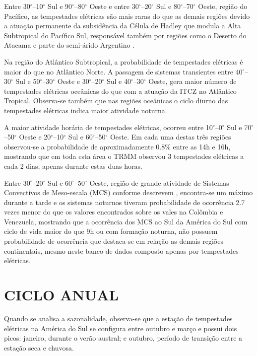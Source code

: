 Entre 30$^{\circ}$--10$^{\circ}$ Sul e 90$^{\circ}$--80$^{\circ}$ Oeste e entre 30$^{\circ}$--20$^{\circ}$ Sul e 80$^{\circ}$--70$^{\circ}$ Oeste, região do Pacífico, as tempestades elétricas são mais raras do que as demais regiões devido a atuação permanente da subsidência da Célula de Hadley que modula a Alta Subtropical do Pacífico Sul, responsável também por regiões como o Deserto do Atacama e parte do semi-árido Argentino \cite{reboita2010regimes}.

Na região do Atlântico Subtropical, a probabilidade de tempestades elétricas é maior do que no Atlântico Norte. A passagem de sistemas transientes entre 40$^{\circ}$--30$^{\circ}$ Sul e 50$^{\circ}$--30$^{\circ}$ Oeste e 30$^{\circ}$--20$^{\circ}$ Sul e 40$^{\circ}$--30$^{\circ}$ Oeste, gera maior número de tempestades elétricas oceânicas do que com a atuação da ITCZ no Atlântico Tropical. Observa-se também que nas regiões oceânicas o ciclo diurno das tempestades elétricas indica maior atividade noturna.


A maior atividade horária de tempestades elétricas, ocorreu entre 10$^{\circ}$--0$^{\circ}$ Sul e 70$^{\circ}$--50$^{\circ}$ Oeste e 20$^{\circ}$--10$^{\circ}$ Sul e 60$^{\circ}$--50$^{\circ}$ Oeste. Em cada uma destas três regiões observou-se a probabilidade de aproximadamente 0.8\% entre as 14h e 16h, mostrando que em toda esta área o TRMM observou 3 tempestades elétricas a cada 2 dias, apenas durante estas duas horas.


Entre 30$^{\circ}$--20$^{\circ}$ Sul e 60$^{\circ}$--50$^{\circ}$ Oeste,  região de grande atividade de Sistemas Convectivos de Meso-escala (MCS) conforme descrevem , encontra-se um máximo durante a tarde e os sistemas noturnos tiveram probabilidade de ocorrência 2.7 vezes menor do que os valores encontrados sobre os vales na Colômbia e Venezuela, mostrando que a ocorrência dos MCS ao Sul da América do Sul com ciclo de vida maior do que 9h ou com formação noturna, não possuem probabilidade de ocorrência que destaca-se em relação as demais regiões continentais, mesmo neste banco de dados composto apenas por tempestades elétricas. 

\section{CICLO ANUAL}

Quando se analisa a sazonalidade, observa-se que a estação de tempestades elétricas na América do Sul se configura entre outubro e março e possui dois picos: janeiro, durante o verão austral; e outubro, período de transição entre a estação seca e chuvosa. 


